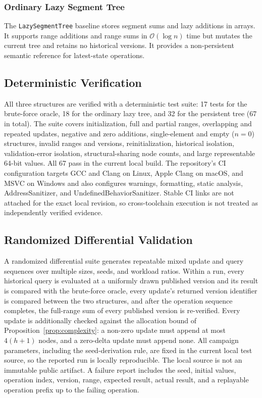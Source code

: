 \documentclass[conference]{IEEEtran}
\begin{document}
\subsubsection{Ordinary Lazy Segment Tree}
The \texttt{LazySegmentTree} baseline stores segment sums and lazy additions in arrays. It
supports range additions and range sums in $\mathcal{O}(\log n)$ time but mutates the current
tree and retains no historical versions. It provides a non-persistent semantic reference for
latest-state operations.

\subsection{Deterministic Verification}
All three structures are verified with a deterministic test suite: 17 tests for the brute-force
oracle, 18 for the ordinary lazy tree, and 32 for the persistent tree (67 in total). The suite
covers initialization, full and partial ranges, overlapping and repeated updates, negative and
zero additions, single-element and empty ($n = 0$) structures, invalid ranges and versions,
reinitialization, historical isolation, validation-error isolation, structural-sharing node counts, and
large representable 64-bit values. All 67 pass in the current local build. The repository's CI
configuration targets GCC and Clang on Linux, Apple Clang on macOS, and MSVC on Windows and also
configures warnings, formatting, static analysis, AddressSanitizer, and
UndefinedBehaviorSanitizer. Stable CI links are not attached for the exact local revision, so
cross-toolchain execution is not treated as
independently verified evidence.

\subsection{Randomized Differential Validation}
\label{sec:diffmethod}
A randomized differential suite generates repeatable mixed update and query sequences over
multiple sizes, seeds, and workload ratios. Within a run, every
historical query is evaluated at a uniformly drawn published version and its result is compared
with the brute-force oracle, every update's returned version identifier is compared between the
two structures, and after the operation sequence completes, the full-range sum of every published
version is re-verified. Every update is additionally checked against the allocation bound of
Proposition~\ref{prop:complexity}: a non-zero update must append at most $4(h+1)$ nodes, and a
zero-delta update must append none. All campaign parameters, including the seed-derivation rule,
are fixed in the current local test source, so the reported run is locally reproducible. The local
source is not an immutable public artifact. A failure report includes the seed,
initial values, operation index, version, range, expected result, actual result, and a replayable
operation prefix up to the failing operation.
\end{document}

